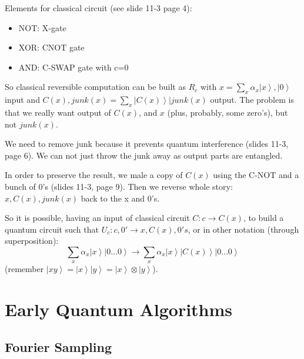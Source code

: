 \documentclass{scrartcl}
\newcommand{\ket}[1]{\left| #1 \right>} %
\begin{document}
Elements for classical circuit (see slide 11-3 page 4):
\begin{itemize}
\item NOT: X-gate
\item XOR: CNOT gate
\item AND: C-SWAP gate with c=0
\end{itemize}

So classical reversible computation can be built as $R_c$ with $x=\sum \limits_x
\alpha_x \ket x , \ket0$ input and $C(x), junk(x) = \sum \limits_x \ket{C(x)} |
junk(x) $ output. The problem is that we really want output of $C(x)$, and $x$
(plus, probably, some zero's), but not $junk(x)$.

We need to remove junk because it prevents quantum interference (slides 11-3,
page 6). We can not just throw the junk away as output parts are entangled.

In order to preserve the result, we male a copy of $C(x)$ using the C-NOT and a
bunch of 0's (slides 11-3, page 9). Then we reverse whole story: $x, C(x),
junk(x)$ back to the x and 0's.

So it is possible, having an input of classical circuit $C: c \to C(x)$, to
build a quantum circuit such that $U_c: c, 0' \to x, C(x), 0's$, or in other
notation (through superposition):
$$ \sum_x \alpha_x \ket x \ket{0 \dots 0} \to \sum_x \alpha_x \ket x \ket{C(x)}
\ket{0\dots0}$$ (remember $\ket{xy} = \ket x \ket y = \ket x \otimes \ket y$).


\section{Early Quantum Algorithms}
\label{sec:EarlyQuantumAlgs}

\subsection{Fourier Sampling}
\label{sec:FourierSampling}
\end{document}
